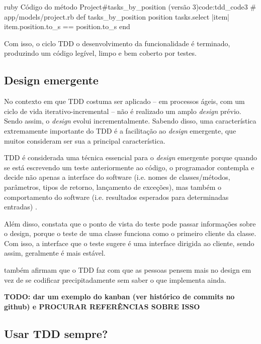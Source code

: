 \begin{mycode}{ruby}%
{Código do método Project\#tasks\_by\_position (versão 3)}{code:tdd_code3}
# app/models/project.rb
def tasks_by_position position
  tasks.select { |item| item.position.to_s == position.to_s }
end
\end{mycode}

Com isso, o ciclo TDD o desenvolvimento da funcionalidade é terminado, produzindo um código legível, limpo e bem coberto por testes.

\subsection{Design emergente} %
\label{sub:design_emergente}

No contexto em que TDD costuma ser aplicado – em processos ágeis, com um ciclo de vida iterativo-incremental – não é realizado um amplo \textit{design} prévio. Sendo assim, o \textit{design} evolui incrementalmente. Sabendo disso, uma característica extremamente importante do TDD é a facilitação ao \textit{design} emergente, que muitos consideram ser sua a principal característica.

TDD é considerada uma técnica essencial para o \textit{design} emergente porque
quando se está escrevendo um teste anteriormente ao código, o programador contempla e decide não apenas a interface do software (i.e. nomes de classes/métodos, parâmetros, tipos de retorno, lançamento de exceções), mas também o comportamento do software (i.e. resultados esperados para determinadas entradas) \cite{JanzenTDD}.

Além disso,  constata que o ponto de vista do teste pode passar informações sobre o design, porque o teste de uma classe funciona como o primeiro cliente da classe. Com isso, a interface que o teste sugere é uma interface dirigida ao cliente, sendo assim, geralmente é mais estável.

 também afirmam que o TDD faz com que as pessoas pensem mais no design em vez de se codificar precipitadamente sem saber o que implementa ainda.

\textbf{TODO: dar um exemplo do kanban (ver histórico de commits no github) e PROCURAR REFERÊNCIAS SOBRE ISSO}


\subsection{Usar TDD sempre?} %
\label{sec:usar_tdd_sempre}

